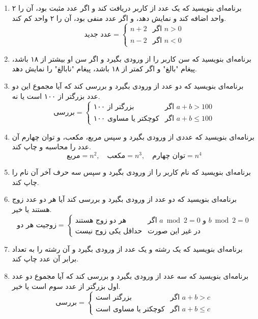 \documentclass[b5paper,12pt]{article}
\begin{document}
\begin{enumerate}
		\item برنامه‌ای بنویسید که یک عدد از کاربر دریافت کند و اگر عدد مثبت بود، آن را ۲ واحد اضافه کند و نمایش دهد، و اگر عدد منفی بود، آن را ۲ واحد کم کند.
		\[
		\text{عدد جدید} = 
		\begin{cases} 
			n + 2 & \text{اگر } n > 0 \\ 
			n - 2 & \text{اگر } n < 0 
		\end{cases} 
		\]
		\item برنامه‌ای بنویسید که سن کاربر را از ورودی بگیرد و اگر سن او بیشتر از ۱۸ باشد، پیغام "بالغ" و اگر کمتر از ۱۸ باشد، پیغام "نابالغ" را نمایش دهد.
		\item برنامه‌ای بنویسید که دو عدد از ورودی بگیرد و بررسی کند که آیا مجموع این دو عدد بزرگتر از ۱۰۰ است یا نه.
		\[
		\text{بررسی} = 
		\begin{cases} 
			\text{بزرگتر از ۱۰۰} & \text{اگر } a + b > 100 \\ 
			\text{کوچکتر یا مساوی ۱۰۰} & \text{اگر } a + b \leq 100 
		\end{cases} 
		\]
		\item برنامه‌ای بنویسید که عددی از ورودی بگیرد و سپس مربع، مکعب، و توان چهارم آن عدد را محاسبه و چاپ کند.
		\[
		\text{مربع} = n^2, \quad 
		\text{مکعب} = n^3, \quad 
		\text{توان چهارم} = n^4
		\]
		\item برنامه‌ای بنویسید که نام کاربر را از ورودی بگیرد و سپس سه حرف آخر آن نام را چاپ کند.
		\item برنامه‌ای بنویسید که دو عدد از ورودی بگیرد و بررسی کند آیا هر دو عدد زوج هستند یا خیر.
		\[
		\text{زوجیت هر دو} = 
		\begin{cases} 
			\text{هر دو زوج هستند} & \text{اگر } a \bmod 2 = 0 \text{ و } b \bmod 2 = 0 \\ 
			\text{حداقل یکی زوج نیست} & \text{در غیر این صورت} 
		\end{cases} 
		\]
		\item برنامه‌ای بنویسید که یک رشته و یک عدد از ورودی بگیرد و آن رشته را به تعداد برابر آن عدد چاپ کند.
		\item برنامه‌ای بنویسید که سه عدد از ورودی بگیرد و بررسی کند که آیا مجموع دو عدد اول بزرگتر از عدد سوم است یا خیر.
		\[
		\text{بررسی} = 
		\begin{cases} 
			\text{بزرگتر است} & \text{اگر } a + b > c \\ 
			\text{کوچکتر یا مساوی است} & \text{اگر } a + b \leq c 
		\end{cases} 
		\]
		
		
	\end{enumerate}
	
\end{document}
